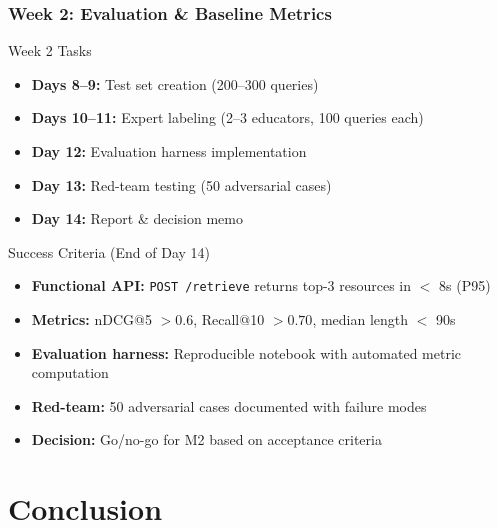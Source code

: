 \documentclass[aspectratio=169]{beamer}
\begin{document}
\begin{frame}
\frametitle{Week 2: Evaluation \& Baseline Metrics}
\begin{block}{Week 2 Tasks}
\begin{itemize}
\item \textbf{Days 8--9:} Test set creation (200--300 queries)
\item \textbf{Days 10--11:} Expert labeling (2--3 educators, 100 queries each)
\item \textbf{Day 12:} Evaluation harness implementation
\item \textbf{Day 13:} Red-team testing (50 adversarial cases)
\item \textbf{Day 14:} Report \& decision memo
\end{itemize}
\end{block}

\begin{block}{Success Criteria (End of Day 14)}
\begin{itemize}
\item \textbf{Functional API:} \texttt{POST /retrieve} returns top-3 resources in $<$ 8s (P95)
\item \textbf{Metrics:} nDCG@5 $> 0.6$, Recall@10 $> 0.70$, median length $<$ 90s
\item \textbf{Evaluation harness:} Reproducible notebook with automated metric computation
\item \textbf{Red-team:} 50 adversarial cases documented with failure modes
\item \textbf{Decision:} Go/no-go for M2 based on acceptance criteria
\end{itemize}
\end{block}
\end{frame}

\section{Conclusion}
\end{document}
